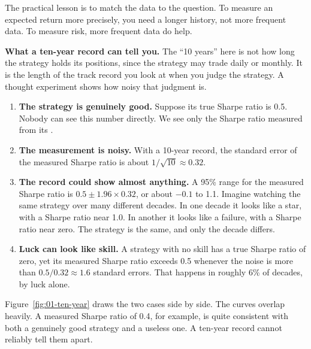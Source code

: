 The practical lesson is to match the data to the question. To measure an expected return more precisely, you need a longer history, not more frequent data. To measure risk, more frequent data do help.

\textbf{What a ten-year record can tell you.} The ``10 years'' here is not how long the strategy holds its positions, since the strategy may trade daily or monthly. It is the length of the track record you look at when you judge the strategy. A thought experiment shows how noisy that judgment is.

\begin{enumerate}
  \item \textbf{The strategy is genuinely good.} Suppose its true Sharpe ratio is 0.5. Nobody can see this number directly. We see only the Sharpe ratio measured from its .
  \item \textbf{The measurement is noisy.} With a 10-year record, the standard error of the measured Sharpe ratio is about $1/\sqrt{10} \approx 0.32$.
  \item \textbf{The record could show almost anything.} A 95\% range for the measured Sharpe ratio is $0.5 \pm 1.96 \times 0.32$, or about $-0.1$ to 1.1. Imagine watching the same strategy over many different decades. In one decade it looks like a star, with a Sharpe ratio near 1.0. In another it looks like a failure, with a Sharpe ratio near zero. The strategy is the same, and only the decade differs.
  \item \textbf{Luck can look like skill.} A strategy with no skill has a true Sharpe ratio of zero, yet its measured Sharpe ratio exceeds 0.5 whenever the noise is more than $0.5/0.32 \approx 1.6$ standard errors. That happens in roughly 6\% of decades, by luck alone.
\end{enumerate}

Figure~\ref{fig:01-ten-year} draws the two cases side by side. The curves overlap heavily. A measured Sharpe ratio of 0.4, for example, is quite consistent with both a genuinely good strategy and a useless one. A ten-year record cannot reliably tell them apart.


